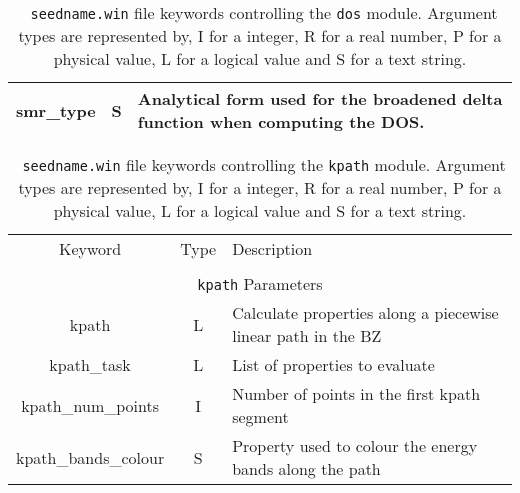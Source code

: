 \begin{table}[h!]
\begin{center}
\begin{tabular}{|c|c|p{6cm}|}
  {\sc [dos\_]smr\_type} & S & Analytical form used for the broadened delta function
  when computing the DOS. \\
  \hline
\end{tabular}
\caption[Parameter file keywords controlling the DOS module.]  {{\tt
    seedname.win} file keywords controlling the {\tt dos}
  module. Argument types are represented by, I for a integer, R for a
  real number, P for a physical value, L for a logical value and S for
  a text string.}
\label{parameter_keywords_dos}
\end{center}
\end{table}


\begin{table}[h!]
\begin{center}
\begin{tabular}{|c|c|p{6cm}|}
  \hline
  Keyword & Type & Description \\
  &      &             \\
  \hline\hline
  \multicolumn{3}{|c|}{{\tt kpath} Parameters} \\
  \hline
  {\sc kpath}  & L & Calculate properties along a piecewise linear path in the BZ \\
  {\sc kpath\_task}& L & List of properties to evaluate\\
  {\sc kpath\_num\_points}& I & Number of points in the first kpath segment\\
  {\sc kpath\_bands\_colour}& S & Property used to colour the energy bands along the path\\
  \hline
\end{tabular}
\caption[Parameter file keywords controlling the kpath module.]  {{\tt
    seedname.win} file keywords controlling the {\tt kpath}
  module. Argument types are represented by, I for a integer, R for a
  real number, P for a physical value, L for a logical value and S for
  a text string.}
\label{parameter_keywords_kpath}
\end{center}
\end{table}

